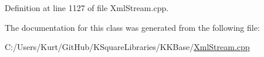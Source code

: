 Definition at line 1127 of file Xml\+Stream.\+cpp.



The documentation for this class was generated from the following file\+:\begin{DoxyCompactItemize}
\item 
C\+:/\+Users/\+Kurt/\+Git\+Hub/\+K\+Square\+Libraries/\+K\+K\+Base/\hyperlink{_xml_stream_8cpp}{Xml\+Stream.\+cpp}\end{DoxyCompactItemize}
